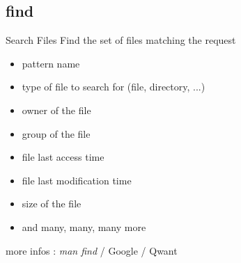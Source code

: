 \subsection{find}
\begin{frame}[fragile]{Search Files}
Find the set of files matching the request
\begin{itemize}
  \pause \item pattern name
  \pause \item type of file to search for (file, directory, ...)
  \pause \item owner of the file
  \pause \item group of the file
  \pause \item file last access time
  \pause \item file last modification time
  \pause \item size of the file
  \pause \item and many, many, many more
\end{itemize}
\pause
more infos : \emph{man find} / Google / Qwant

\end{frame}
